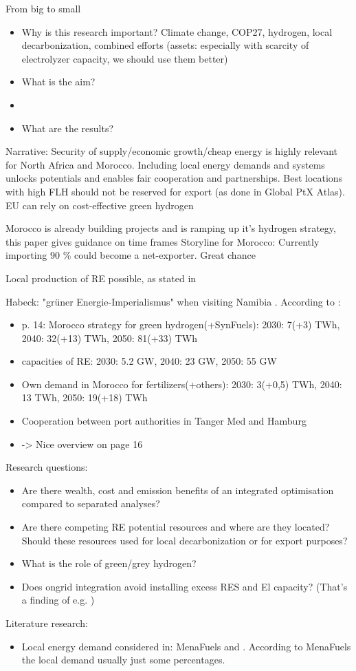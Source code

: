 From big to small
\begin{itemize}
    \item Why is this research important? Climate change, COP27, hydrogen, local decarbonization, combined efforts (assets: especially with scarcity of electrolyzer capacity, we should use them better)
    \item What is the aim?
    \item 
    \item What are the results?
\end{itemize}
Narrative: 
Security of supply/economic growth/cheap energy is highly relevant for North Africa and Morocco. 
Including local energy demands and systems unlocks potentials and enables fair cooperation and partnerships.
Best locations with high FLH should not be reserved for export (as done in Global PtX Atlas). 
EU can rely on cost-effective green hydrogen

Morocco is already building projects and is ramping up it's hydrogen strategy, this paper gives guidance on time frames
Storyline for Morocco: Currently importing 90 \% could become a net-exporter. Great chance


Local production of RE possible, as stated in \cite{Ersoy2022}

Habeck: "gr{\"u}ner Energie-Imperialismus" when visiting Namibia \cite{HabeckEnergieimperialismus}.
According to \cite{Ersoy2022}:
\begin{itemize}
    \item p. 14: Morocco strategy for green hydrogen(+SynFuels): 2030: 7(+3) TWh, 2040: 32(+13) TWh, 2050: 81(+33) TWh
    \item capacities of RE: 2030: 5.2 GW, 2040: 23 GW, 2050: 55 GW
    \item Own demand in Morocco for fertilizers(+others): 2030: 3(+0,5) TWh, 2040: 13 TWh, 2050: 19(+18) TWh 
    \item Cooperation between port authorities in Tanger Med and Hamburg
    \item -> Nice overview on page 16
\end{itemize}

Research questions:
\begin{itemize}
    \item Are there wealth, cost and emission benefits of an integrated optimisation compared to separated analyses?
    \item Are there competing RE potential resources and where are they located? Should these resources used for local decarbonization or for export purposes?
    \item What is the role of green/grey hydrogen?   
    \item Does ongrid integration avoid installing excess RES and El capacity? (That's a finding of e.g. \cite{Ruhnau2022})
\end{itemize}

Literature research:
\begin{itemize}
    \item Local energy demand considered in: MenaFuels and \cite{Hampp2021}. According to MenaFuels the local demand usually just some percentages.
\end{itemize}